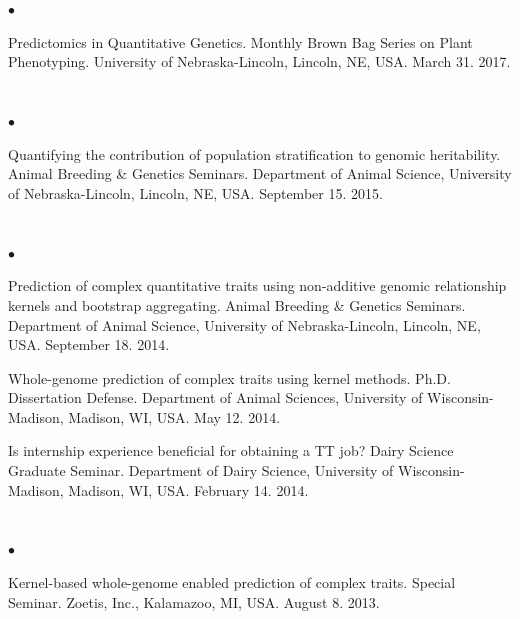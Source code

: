 \documentclass[margin,line,10pt]{res}
\newenvironment{list2}{
  \begin{list}{$\bullet$}{%
      \setlength{\itemsep}{0in}
      \setlength{\parsep}{0in} \setlength{\parskip}{0in}
      \setlength{\topsep}{0in} \setlength{\partopsep}{0in} 
      \setlength{\leftmargin}{0.2in}}}{\end{list}}
\begin{document}
\begin{resume}
\section{}
\begin{list2}
\item [{\bf 11}.] Predictomics in Quantitative Genetics. Monthly Brown Bag Series on Plant Phenotyping. University of Nebraska-Lincoln, Lincoln, NE, USA. March 31. 2017.
\end{list2}  

\section{}
\begin{list2}
\item  [{\bf 10}.] Quantifying the contribution of population stratification to genomic heritability. Animal Breeding \& Genetics Seminars. Department of Animal Science, University of Nebraska-Lincoln, Lincoln, NE, USA. September 15. 2015. 
\end{list2}  

\section{}
\begin{list2}
\item  [{\bf 9}.] Prediction of complex quantitative traits using non-additive genomic relationship kernels and bootstrap aggregating. Animal Breeding \& Genetics Seminars. Department of Animal Science, University of Nebraska-Lincoln, Lincoln, NE, USA. September 18. 2014. 
\vspace{0.5cm}

\item [{\bf 8}.] Whole-genome prediction of complex traits using kernel methods. Ph.D. Dissertation Defense. Department of Animal Sciences, University of Wisconsin-Madison, Madison, WI, USA. May 12. 2014.
\vspace{0.5cm}

\item [{\bf 7}.] Is internship experience beneficial for obtaining a TT job? Dairy Science Graduate Seminar. Department of Dairy Science, University of Wisconsin-Madison, Madison, WI, USA. February 14. 2014.
\end{list2}  

\section{}
\begin{list2}
\item  [{\bf 6}.] Kernel-based whole-genome enabled prediction of complex traits. Special Seminar.  Zoetis, Inc., Kalamazoo, MI, USA. August 8. 2013.
\end{list2}  


\end{resume}
\end{document}
